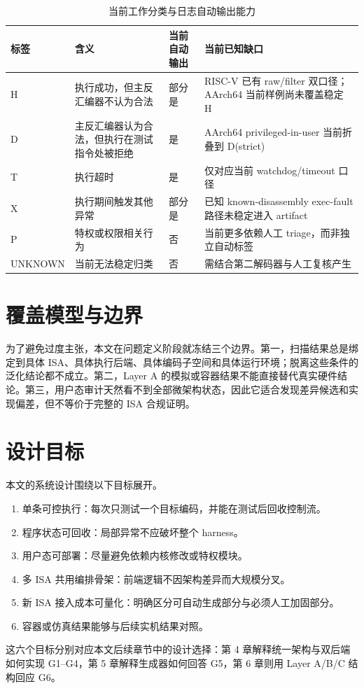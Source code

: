 \begin{table}[t]
  \centering
  \caption{当前工作分类与日志自动输出能力}
  \label{tab:taxonomy}
  \begin{tabular}{p{1.5cm}p{4.0cm}p{2.5cm}p{5.0cm}}
    \toprule
    标签 & 含义 & 当前自动输出 & 当前已知缺口 \\
    \midrule
    H & 执行成功，但主反汇编器不认为合法 & 部分是 & RISC-V 已有 raw/filter 双口径；AArch64 当前样例尚未覆盖稳定 H \\
    D & 主反汇编器认为合法，但执行在测试指令处被拒绝 & 是 & AArch64 privileged-in-user 当前折叠到 D(strict) \\
    T & 执行超时 & 是 & 仅对应当前 watchdog/timeout 口径 \\
    X & 执行期间触发其他异常 & 部分是 & 已知 known-disassembly exec-fault 路径未稳定进入 artifact \\
    P & 特权或权限相关行为 & 否 & 当前更多依赖人工 triage，而非独立自动标签 \\
    UNKNOWN & 当前无法稳定归类 & 否 & 需结合第二解码器与人工复核产生 \\
    \bottomrule
  \end{tabular}
\end{table}

\section{覆盖模型与边界}

为了避免过度主张，本文在问题定义阶段就冻结三个边界。第一，扫描结果总是绑定到具体 ISA、具体执行后端、具体编码子空间和具体运行环境；脱离这些条件的泛化结论都不成立。第二，Layer A 的模拟或容器结果不能直接替代真实硬件结论。第三，用户态审计天然看不到全部微架构状态，因此它适合发现差异候选和实现偏差，但不等价于完整的 ISA 合规证明。

\section{设计目标}

本文的系统设计围绕以下目标展开。
\begin{enumerate}[leftmargin=2em]
  \item 单条可控执行：每次只测试一个目标编码，并能在测试后回收控制流。
  \item 程序状态可回收：局部异常不应破坏整个 harness。
  \item 用户态可部署：尽量避免依赖内核修改或特权模块。
  \item 多 ISA 共用编排骨架：前端逻辑不因架构差异而大规模分叉。
  \item 新 ISA 接入成本可量化：明确区分可自动生成部分与必须人工加固部分。
  \item 容器或仿真结果能够与后续实机结果对照。
\end{enumerate}

这六个目标分别对应本文后续章节中的设计选择：第 4 章解释统一架构与双后端如何实现 G1--G4，第 5 章解释生成器如何回答 G5，第 6 章则用 Layer A/B/C 结构回应 G6。
